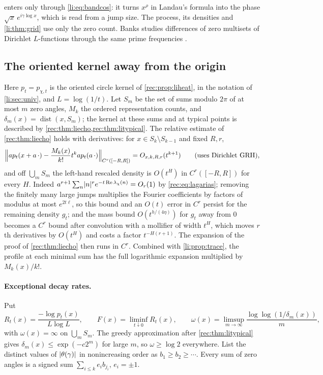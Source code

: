  enters only through \eqref{li:eq:bandcos}: it turns $x^\rho$ in Landau's formula into the
phase $\sqrt x\,e^{i\gamma\log x}$, which is read from a jump size. The process, its densities and
\cref{li:thm:grid} use only the zero count. Banks studies differences of zero multisets of Dirichlet
$L$-functions through the same prime frequencies \cite{Banks2023Comparing}.

\subsection{The oriented kernel away from the origin}\label{li:sec:offorigin}

Here $p_t=p_{\chi,t}$ is the oriented circle kernel of \cref{rec:prop:liheat}, in the notation of
\cref{li:sec:univ}, and $L=\log(1/t)$. Let $S_m$ be the set of sums modulo $2\pi$ of at most $m$ zero angles,
$M_k$ the ordered representation counts, and $\delta_m(x)=\operatorname{dist}(x,S_m)$; the kernel at these sums
and at typical points is described by \cref{rec:thm:liecho,rec:thm:litypical}. The relative estimate of
\cref{rec:thm:liecho} holds with derivatives: for $x\in S_k\setminus S_{k-1}$ and fixed $R,r$,
\begin{equation}\label{li:eq:Crprofile}
 \Bigl\|ap_t(x+a\,\cdot)-\frac{M_k(x)}{k!}t^kap_t(a\,\cdot)\Bigr\|_{C^r([-R,R])}=O_{x,k,R,r}(t^{k+1})\qquad(\text{uses Dirichlet GRH}),
\end{equation}
and off $\bigcup_mS_m$ the left-hand rescaled density is $O(t^H)$ in $C^r([-R,R])$ for every $H$. Indeed
$a^{r+1}\sum_n\lvert n\rvert^re^{-t\operatorname{Re}\lambda_\chi(n)}=O_r(1)$ by \eqref{rec:eq:lagarias}; removing the finitely many large jumps
multiplies the Fourier coefficients by factors of modulus at most $e^{2t\ell}$, so this bound and an $O(t)$
error in $C^r$ persist for the remaining density $g_t$; and the mass bound $O(t^{h/(4\eta)})$ for $g_t$ away from
$0$ becomes a $C^r$ bound after convolution with a mollifier of width $t^H$, which moves $r$th derivatives
by $O(t^H)$ and costs a factor $t^{-H(r+1)}$. The expansion of the proof of \cref{rec:thm:liecho} then
runs in $C^r$. Combined with \cref{li:prop:trace}, the profile at each minimal sum has the full
logarithmic expansion multiplied by $M_k(x)/k!$.

\paragraph{Exceptional decay rates.} Put
\[
 R_t(x)=\frac{-\log p_t(x)}{L\log L},\qquad F(x)=\liminf_{t\downarrow0}R_t(x),\qquad
 \omega(x)=\limsup_{m\to\infty}\frac{\log\log(1/\delta_m(x))}m,
\]
with $\omega(x)=\infty$ on $\bigcup_mS_m$. The greedy approximation after \cref{rec:thm:litypical} gives
$\delta_m(x)\le\exp(-c2^m)$ for large $m$, so $\omega\ge\log2$ everywhere. List the distinct values of $\lvert\theta(\gamma)\rvert$ in
nonincreasing order as $b_1\ge b_2\ge\cdots$. Every sum of zero angles is a signed sum
$\sum_{i\le k}e_ib_{j_i}$, $e_i=\pm1$.

